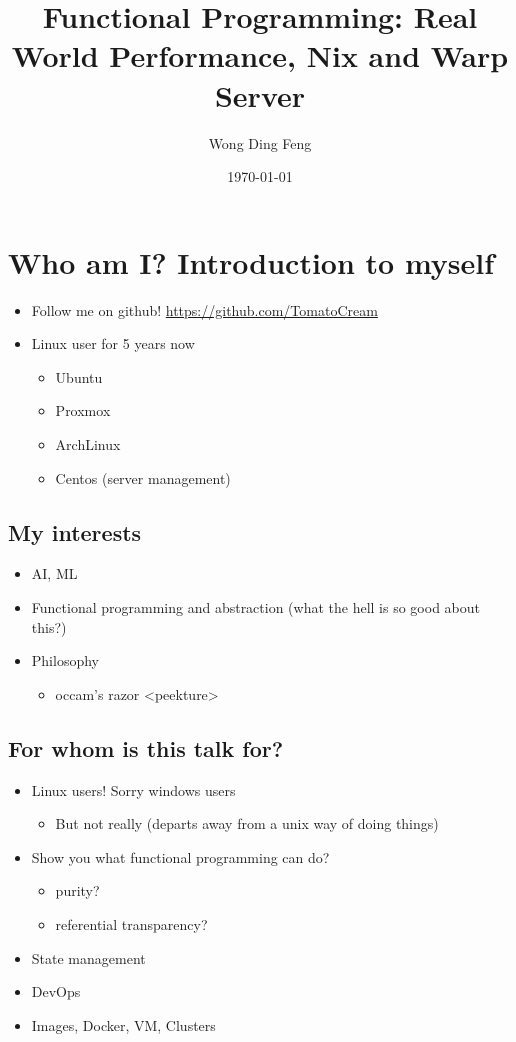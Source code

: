 \documentclass[11pt]{article}
\author{Wong Ding Feng}
\date{\today}
\title{Functional Programming: Real World Performance, Nix and Warp Server}
\begin{document}
\maketitle
\tableofcontents

\section{Who am I? Introduction to myself}
\label{sec:orga745014}
\begin{itemize}
\item Follow me on github!
\url{https://github.com/TomatoCream}
\item Linux user for 5 years now
\begin{itemize}
\item Ubuntu
\item Proxmox
\item ArchLinux
\item Centos (server management)
\end{itemize}
\end{itemize}
\subsection{My interests}
\label{sec:org021a70a}
\begin{itemize}
\item AI, ML
\item Functional programming and abstraction (what the hell is so good about this?)
\item Philosophy
\begin{itemize}
\item occam's razor
<peekture>
\end{itemize}
\end{itemize}
\subsection{For whom is this talk for?}
\label{sec:org89b1014}
\begin{itemize}
\item Linux users! Sorry windows users
\begin{itemize}
\item But not really (departs away from a unix way of doing things)
\end{itemize}
\item Show you what functional programming can do?
\begin{itemize}
\item purity?
\item referential transparency?
\end{itemize}
\item State management
\item DevOps
\item Images, Docker, VM, Clusters
\end{itemize}
\end{document}
